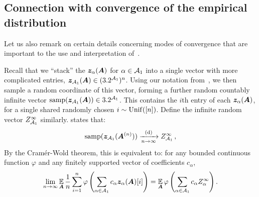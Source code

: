 \subsection{Connection with convergence of the empirical distribution}

Let us also remark on certain details concerning modes of convergence that are important to the use and interpretation of~.

Recall that we ``stack'' the ${\bm z}_{\alpha}({\bm A})$ for $\alpha\in{\cal A}_1$ into a single vector with more complicated entries, ${\bm z}_{{\cal A}_1}({\bm A}) \in (3.2^{{\cal A}_1})^n$.
Using our notation from~, we then sample a random coordinate of this vector, forming a further random countably infinite vector $\mathrm{samp}({\bm z}_{{\cal A}_1}({\bm A})) \in 3.2^{{\cal A}_1}$.
This contains the $i$th entry of each ${\bm z}_{\alpha}({\bm A})$, for a single shared randomly chosen $i \sim \mathrm{Unif}([n])$.
Define the infinite random vector $Z_{{\cal A}_1}^{\infty}$ similarly.  states that:
\begin{equation}
\mathrm{samp}({\bm z}_{{\cal A}_1}({\bm A}^{(n)})) \xrightarrow[n \to \infty]{\text{(d)}} Z_{{\cal A}_1}^{\infty}\,,
\label{eq:samp-conv-d}
\end{equation}
By the Cram\'{e}r-Wold theorem, this is equivalent to: for any bounded continuous function $\varphi$ and any finitely supported vector of coefficients $c_{\alpha}$,
\[ \lim_{n \to \infty} \operatorname*{\mathbb{E}}_{{\bm A}} \frac{1}{n}\sum_{i = 1}^n \varphi\left(\sum_{\alpha \in {\cal A}_1} c_{\alpha} {\bm z}_{\alpha}({\bm A})[i]\right) = \operatorname*{\mathbb{E}}_{{\bm A}} \varphi\left(\sum_{\alpha \in {\cal A}_1} c_{\alpha} Z_{\alpha}^{\infty} \right). \]

